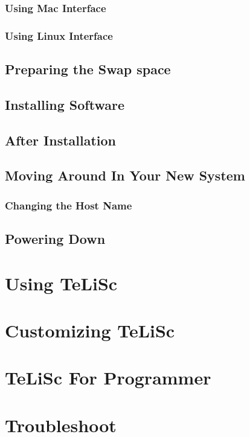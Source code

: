 \documentclass[a4paper,12pt]{book}
\begin{document}
    \subsection{Using Mac Interface}
    \subsection{Using Linux Interface}
    
    \section{Preparing the Swap space}
    \section{Installing Software}
    \section{After Installation}
    
    \section{Moving Around In Your New System}
    \subsection{Changing the Host Name}
    
    \section{Powering Down}
    
    
    
    
    \chapter{Using TeLiSc}
    
    
    \chapter{Customizing TeLiSc}
    
    
    \chapter{TeLiSc For Programmer} 
    
    
    \chapter{Troubleshoot} 
    
    
    
    
\end{document}

